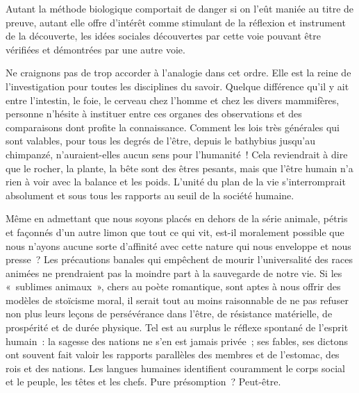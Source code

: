 \documentclass[french,twoside]{book} %
\newcommand{\astermono}{\medskip\centerline{\color{rubric}\large\selectfont{\syms ✻}}\medskip\par}%
\begin{document}
\noindent Autant la méthode biologique comportait de danger si on l’eût maniée au titre de preuve, autant elle offre d’intérêt comme stimulant de la réflexion et instrument de la découverte, les idées sociales découvertes par cette voie pouvant être vérifiées et démontrées par une autre voie.\par
Ne craignons pas de trop accorder à l’analogie dans cet ordre. Elle est la reine de l’investigation pour toutes les disciplines du savoir. Quelque différence qu’il y ait entre l’intestin, le foie, le cerveau chez l’homme et chez les divers mammifères, personne n’hésite à instituer entre ces organes des observations et des comparaisons dont profite la connaissance. Comment les lois très générales qui sont valables, pour tous les degrés de l’être, depuis le bathybius jusqu’au chimpanzé, n’auraient-elles aucun sens pour l’humanité ! Cela reviendrait à dire que le rocher, la plante, la bête sont des êtres pesants, mais que l’être humain n’a rien à voir avec la balance et les poids. L’unité du plan de la vie s’interromprait absolument et sous tous les rapports au seuil de la société humaine.\par
Même en admettant que nous soyons placés en dehors de la série animale, pétris et façonnés d’un autre limon que tout ce qui vit, est-il moralement possible que nous n’ayons aucune sorte d’affinité avec cette nature qui nous enveloppe et nous presse ? Les précautions banales qui empêchent de mourir l’universalité des races animées ne prendraient pas la moindre part à la sauvegarde de notre vie. Si les « sublimes animaux », chers au poète romantique, sont aptes à nous offrir des modèles de stoïcisme moral, il serait tout au moins raisonnable de ne pas refuser non plus leurs leçons de persévérance dans l’être, de résistance matérielle, de prospérité et de durée physique. Tel est au surplus le réflexe spontané de l’esprit humain : la sagesse des nations ne s’en est jamais privée ; ses fables, ses dictons ont souvent fait valoir les rapports parallèles des membres et de l’estomac, des rois et des nations. Les langues humaines identifient couramment le corps social et le peuple, les têtes et les chefs. Pure présomption ? Peut-être.\par

\astermono
\end{document}
